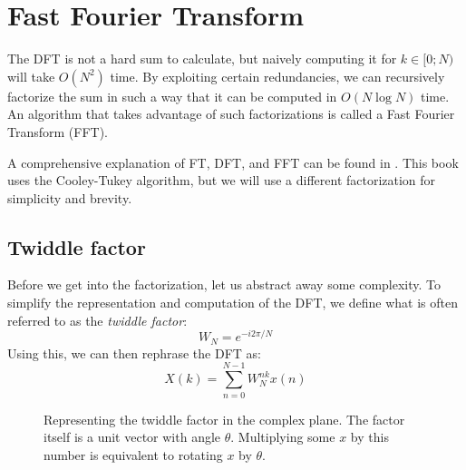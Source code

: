 \section{Fast Fourier Transform\label{sec:fft}}
The DFT is not a hard sum to calculate,
but naively computing it for $k \in [0;N)$ will take $O(N^2)$ time.
By exploiting certain redundancies,
we can recursively factorize the sum in such a way that it can be computed in $O(N \log N)$ time.
An algorithm that takes advantage of such factorizations is called a Fast Fourier Transform (FFT).

A comprehensive explanation of FT, DFT, and FFT can be found in \cite{fft}.
This book uses the Cooley-Tukey algorithm,
but we will use a different factorization for simplicity and brevity.

\subsection{Twiddle factor}
Before we get into the factorization, let us abstract away some complexity.
To simplify the representation and computation of the DFT,
we define what is often referred to as the \textit{twiddle factor}:
\begin{equation}
    W_N = e^{-i 2 \pi / N}
\end{equation}
Using this, we can then rephrase the DFT as:
\begin{equation}
    X(k) = \sum_{n = 0}^{N - 1} W_N^{nk} x(n)
\end{equation}
\begin{figure}
    \centering
    \caption{Representing the twiddle factor in the complex plane.
    The factor itself is a unit vector with angle $\theta$.
    Multiplying some $x$ by this number is equivalent to rotating $x$ by $\theta$.\label{fig:twid}}
\end{figure}
